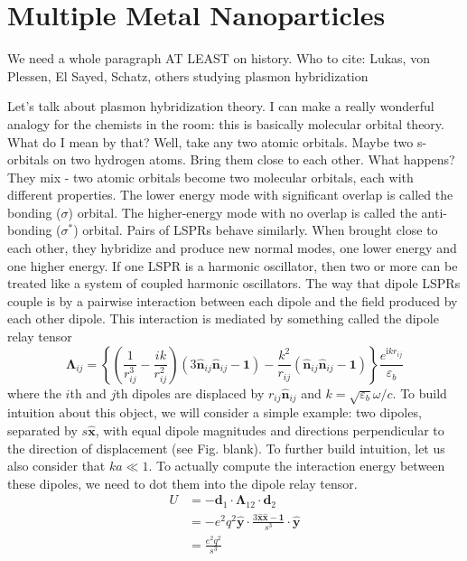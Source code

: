 \documentclass [11pt, proquest] {uwthesis}[2016/11/22]
\begin{document}
\section{Multiple Metal Nanoparticles}

We need a whole paragraph AT LEAST on history.
Who to cite: Lukas, von Plessen, El Sayed, Schatz, others studying plasmon hybridization

Let's talk about plasmon hybridization theory. I can make a really wonderful analogy for the chemists in the room: this is basically molecular orbital theory. What do I mean by that? Well, take any two atomic orbitals. Maybe two s-orbitals on two hydrogen atoms. Bring them close to each other. What happens? They mix - two atomic orbitals become two molecular orbitals, each with different properties. The lower energy mode with significant overlap is called the bonding ($\sigma$) orbital. The higher-energy mode with no overlap is called the anti-bonding ($\sigma^*$) orbital. Pairs of LSPRs behave similarly. When brought close to each other, they hybridize and produce new normal modes, one lower energy and one higher energy. If one LSPR is a harmonic oscillator, then two or more can be treated like a system of coupled harmonic oscillators. The way that dipole LSPRs couple is by a pairwise interaction between each dipole and the field produced by each other dipole. This interaction is mediated by something called the dipole relay tensor 
\begin{equation}
\boldsymbol{\Lambda}_{ij} = \left\{\left(\frac{1}{r_{ij}^3} - \frac{ik}{r_{ij}^2}\right)\left(3\hat{\textbf{n}}_{ij}\hat{\textbf{n}}_{ij} - \textbf{1}\right) - \frac{k^2}{r_{ij}}\left(\hat{\textbf{n}}_{ij}\hat{\textbf{n}}_{ij} - \textbf{1}\right)\right\}\frac{e^{\textrm{i}kr_{ij}}}{\varepsilon_b}
\label{dipole_relay_tensor_full}
\end{equation}
where the $i$th and $j$th dipoles are displaced by $r_{ij}\hat{\textbf{n}}_{ij}$ and $k=\sqrt{\varepsilon_b}\omega/c$. To build intuition about this object, we will consider a simple example: two dipoles, separated by $s\hat{\textbf{x}}$, with equal dipole magnitudes and directions perpendicular to the direction of displacement (see Fig. blank). To further build intuition, let us also consider that $ka \ll 1$. To actually compute the interaction energy between these dipoles, we need to dot them into the dipole relay tensor.
\begin{equation}
\begin{split}
U &= -\textbf{d}_1\cdot\boldsymbol{\Lambda}_{12}\cdot\textbf{d}_2\\
&= -e^2q^2\hat{\textbf{y}}\cdot\frac{3\hat{\textbf{x}}\hat{\textbf{x}} - \textbf{1}}{s^3}\cdot\hat{\textbf{y}}\\
&= \frac{e^2q^2}{s^3}
\label{quasi_int}
\end{split}
\end{equation}
\end{document}
